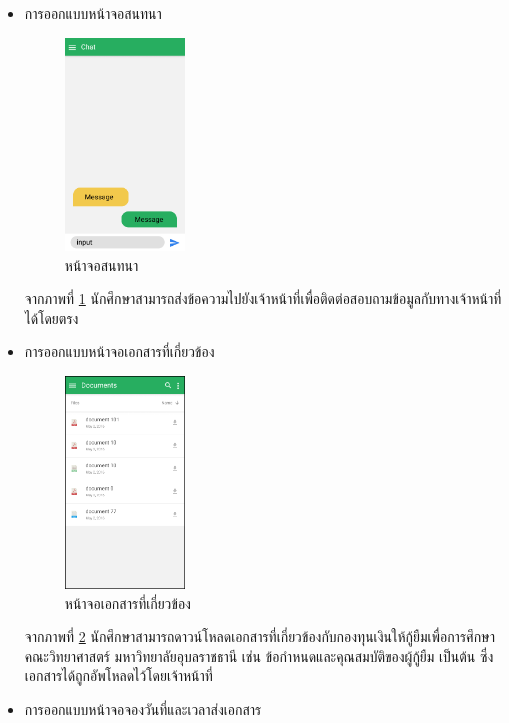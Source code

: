 \begin{enumerate}
\begin{itemize}
\begin{itemize}
				\item การออกแบบหน้าจอสนทนา
				\begin{figure}[H]
					\centering
					\includegraphics[width=0.3\textwidth]{Figures/3/UIMobile/home_chat}
					\caption{หน้าจอสนทนา}
					\label{Fig:home_chat}
				\end{figure}
				จากภาพที่ \ref{Fig:home_chat} นักศึกษาสามารถส่งข้อความไปยังเจ้าหน้าที่เพื่อติดต่อสอบถามข้อมูลกับทางเจ้าหน้าที่ได้โดยตรง
				\item การออกแบบหน้าจอเอกสารที่เกี่ยวข้อง
				\begin{figure}[H]
					\centering
					\includegraphics[width=0.3\textwidth]{Figures/3/UIMobile/home_doc}
					\caption{หน้าจอเอกสารที่เกี่ยวข้อง}
					\label{Fig:home_doc}
				\end{figure}
				จากภาพที่ \ref{Fig:home_doc} นักศึกษาสามารถดาวน์โหลดเอกสารที่เกี่ยวข้องกับกองทุนเงินให้กู้ยืมเพื่อการศึกษา คณะวิทยาศาสตร์ มหาวิทยาลัยอุบลราชธานี เช่น ข้อกำหนดและคุณสมบัติของผู้กู้ยืม เป็นต้น ซึ่งเอกสารได้ถูกอัพโหลดไว้โดยเจ้าหน้าที่
				\item การออกแบบหน้าจอจองวันที่และเวลาส่งเอกสาร
				\begin{figure}[H]
					\centering

\end{figure}
\end{itemize}
\end{itemize}
\end{enumerate}
